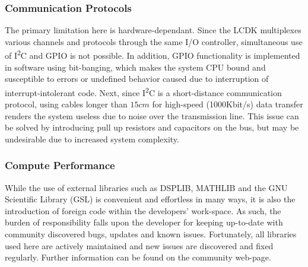 \subsubsection{Communication Protocols}
The primary limitation here is hardware-dependant. Since the LCDK multiplexes various channels and protocols through the same I/O controller, simultaneous use of I\textsuperscript{2}C and GPIO is not possible. In addition, GPIO functionality is implemented in software using bit-banging, which makes the system CPU bound and susceptible to errors or undefined behavior caused due to interruption of interrupt-intolerant code. Next, since I\textsuperscript{2}C is a short-distance communication protocol, using cables longer than $15cm$ for high-speed (1000Kbit/s) data transfer renders the system useless due to noise over the transmission line. This issue can be solved by introducing pull up resistors and capacitors on the bus, but may be undesirable due to increased system complexity.\\

\subsubsection{Compute Performance}
While the use of external libraries such as DSPLIB, MATHLIB and the GNU Scientific Library (GSL) is convenient and effortless in many ways, it is also the introduction of foreign code within the developers' work-space. As such, the burden of responsibility falls upon the developer for keeping up-to-date with community discovered bugs, updates and known issues. Fortunately, all libraries used here are actively maintained and new issues are discovered and fixed regularly. Further information can be found on the community web-page\cite{known_issues}.
